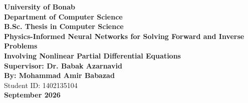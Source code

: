 \clearpage
\thispagestyle{empty}
\begin{singlespace}
\begin{latin}
\begin{center}
{\large\bfseries University of Bonab}\\[2mm]
{\large\bfseries Department of Computer Science}\\[6mm]
{\Large\bfseries B.Sc. Thesis in Computer Science}\\[6mm]
{\LARGE\bfseries Physics-Informed Neural Networks for Solving Forward and Inverse Problems\\[2mm]
Involving Nonlinear Partial Differential Equations}\\[8mm]
{\large\bfseries Supervisor: Dr. Babak Azarnavid}\\[5mm]
{\large\bfseries By: Mohammad Amir Babazad}\\[2mm]
{\normalsize Student ID: 1402135104}\\[8mm]
{\large\bfseries September 2026}
\end{center}
\end{latin}
\end{singlespace}
\clearpage
